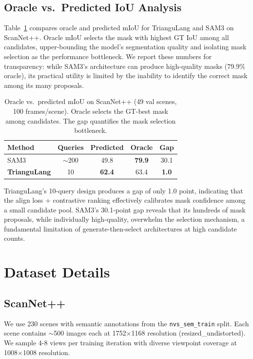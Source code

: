 \subsection{Oracle vs.\ Predicted IoU Analysis}
\label{app:oracle}

Table~\ref{tab:oracle} compares oracle and predicted mIoU for TrianguLang and SAM3 on ScanNet++. Oracle mIoU selects the mask with highest GT IoU among all candidates, upper-bounding the model's segmentation quality and isolating mask selection as the performance bottleneck. We report these numbers for transparency: while SAM3's architecture can produce high-quality masks (79.9\% oracle), its practical utility is limited by the inability to identify the correct mask among its many proposals.

\begin{table}[h]
\centering
\caption{Oracle vs.\ predicted mIoU on ScanNet++ (49 val scenes, 100 frames/scene). Oracle selects the GT-best mask among candidates. The gap quantifies the mask selection bottleneck.}
\label{tab:oracle}
\small
\begin{tabular}{@{}lcccc@{}}
\toprule
\textbf{Method} & \textbf{Queries} & \textbf{Predicted} & \textbf{Oracle} & \textbf{Gap} \\
\midrule
SAM3~\cite{sam3} & $\sim$200 & 49.8 & \textbf{79.9} & 30.1 \\
\textbf{TrianguLang} & 10 & \textbf{62.4} & 63.4 & \textbf{1.0} \\
\bottomrule
\end{tabular}
\end{table}

TrianguLang's 10-query design produces a gap of only 1.0 point, indicating that the align loss + contrastive ranking effectively calibrates mask confidence among a small candidate pool. SAM3's 30.1-point gap reveals that its hundreds of mask proposals, while individually high-quality, overwhelm the selection mechanism, a fundamental limitation of generate-then-select architectures at high candidate counts.

\section{Dataset Details}
\label{app:datasets}

\subsection{ScanNet++}

We use 230 scenes with semantic annotations from the \texttt{nvs\_sem\_train} split. Each scene contains $\sim$500 images each at 1752$\times$1168 resolution (resized\_undistorted). We sample 4-8 views per training iteration with diverse viewpoint coverage at 1008$\times$1008 resolution.

